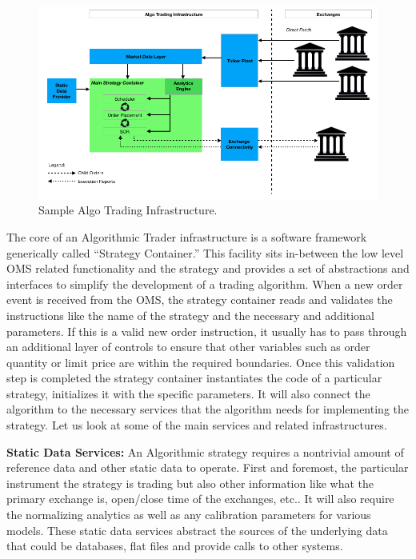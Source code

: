 	\begin{figure}[!ht]
	\centering
	\includegraphics[width=\textwidth]{chapters/chapter_tech/figures/AlgoInfraGraph.png} 
	\caption{Sample Algo Trading Infrastructure.\label{fig:AlgoInfraGraph}}
	\end{figure}
	
The core of an Algorithmic Trader infrastructure is a software framework generically called ``Strategy Container.'' This facility sits in-between the low level OMS related functionality and the strategy and provides a set of abstractions and interfaces to simplify the development of a trading algorithm. When a new order event is received from the OMS, the strategy container reads and validates the instructions like the name of the strategy and the necessary and additional parameters. If this is a valid new order instruction, it usually has to pass through an additional layer of controls to ensure that other variables such as order quantity or limit price are within the required boundaries. Once this validation step is completed the strategy container instantiates the code of a particular strategy, initializes it with the specific parameters. It will also connect the algorithm to the necessary services that the algorithm needs for implementing the strategy. Let us look at some of the main services and related infrastructures. \label{in:trad_infr4} \twomedskip


\noindent\textbf{Static Data Services:} An Algorithmic strategy requires a nontrivial amount of reference data and other static data to operate. First and foremost, the particular instrument the strategy is trading but also other information like what the primary exchange is, open/close time of the exchanges, etc.. It will also require the normalizing analytics as well as any calibration parameters for various models. These static data services abstract the sources of the underlying data that could be databases, flat files and provide calls to other systems. \twomedskip


